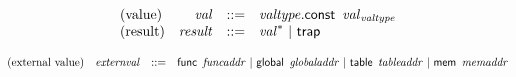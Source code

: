\vspace{1ex}

\vspace{1ex}

$$
\begin{array}{@{}lrrl@{}l@{}}
\mbox{(value)} & {\mathit{val}} &::=& {\mathit{valtype}}.\mathsf{const}~\,{{\mathit{val}}}_{{\mathit{valtype}}} \\
\mbox{(result)} & {\mathit{result}} &::=& {{\mathit{val}}^\ast} ~|~ \mathsf{trap} \\
\end{array}
$$

\vspace{1ex}

$$
\begin{array}{@{}lrrl@{}l@{}}
\mbox{(external value)} & {\mathit{externval}} &::=& \mathsf{func}~\,{\mathit{funcaddr}} ~|~ \mathsf{global}~\,{\mathit{globaladdr}} ~|~ \mathsf{table}~\,{\mathit{tableaddr}} ~|~ \mathsf{mem}~\,{\mathit{memaddr}} \\
\end{array}
$$

\vspace{1ex}

\vspace{1ex}


